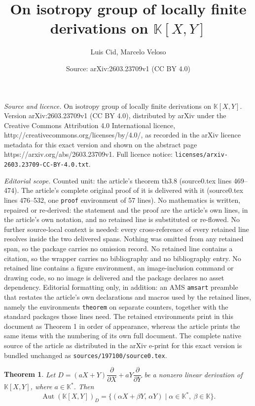 \documentclass[10pt,a4paper]{amsart}
\title{On isotropy group of locally finite derivations on $\mathbb{K}[X,Y]$}
\author{Luis Cid, Marcelo Veloso}
\date{Source: arXiv:2603.23709v1 (CC BY 4.0)}
\newtheorem{theorem}{Theorem}
\begin{document}
\maketitle

\noindent\emph{Source and licence.} On isotropy group of locally finite derivations on $\mathbb{K}[X,Y]$. Version arXiv:2603.23709v1 (CC BY 4.0), distributed by arXiv under the Creative Commons Attribution 4.0 International licence, http://creativecommons.org/licenses/by/4.0/, as recorded in the arXiv licence metadata for this exact version and shown on the abstract page https://arxiv.org/abs/2603.23709v1. Full licence notice: \texttt{licenses/arxiv-2603.23709-CC-BY-4.0.txt}.\par\smallskip

\noindent\textit{Editorial scope.} Counted unit: the article's theorem th3.8 (source0.tex lines 469--474). The article's complete original proof of it is delivered with it (source0.tex lines 476--532, one \texttt{proof} environment of 57 lines). No mathematics is written, repaired or re-derived: the statement and the proof are the article's own lines, in the article's own notation, and no retained line is substituted or re-flowed.  No further source-local context is needed: every cross-reference of every retained line resolves inside the two delivered spans.  Nothing was omitted from any retained span, so the package carries no omission record.  No retained line contains a citation, so the wrapper carries no bibliography and no bibliography entry.  No retained line contains a figure environment, an image-inclusion command or drawing code, so no image is delivered and the package declares no asset dependency.  Editorial formatting only, in addition: an AMS \texttt{amsart} preamble that restates the article's own declarations and macros used by the retained lines, namely the environments \texttt{theorem} on separate counters, together with the standard packages those lines need.  The retained environments print in this document as Theorem 1 in order of appearance, whereas the article prints the same items with the numbering of its own full document.  The complete native source of the article as distributed in the arXiv e-print for this exact version is bundled unchanged as \texttt{sources/197100/source0.tex}.
\begin{theorem} \label{th3.8}
		Let $D=(aX +Y)\dfrac{\partial}{\partial X}+aY\dfrac{\partial}{\partial Y}$ be a nonzero linear derivation of $\mathbb{K}[X,Y]$, where   $a \in \mathbb{K}^*$. Then 
        \[
        \operatorname{Aut}(\mathbb{K}[X,Y])_D= \{(\alpha X +\beta Y,\,\alpha Y ) \mid \alpha \in \mathbb{K}^*,\ \beta \in \mathbb{K}\}.
        \]
\end{theorem}
\end{document}
